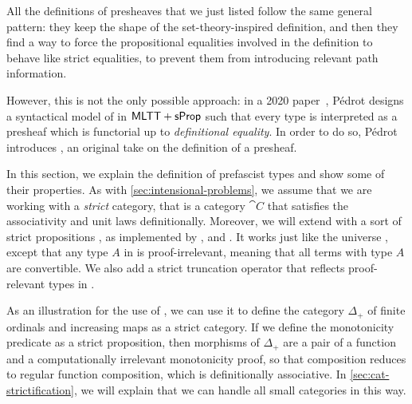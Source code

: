 All the definitions of presheaves that we just listed follow the same general
pattern: they keep the shape of the set-theory-inspired definition, and
then they find a way to force the propositional equalities involved in the
definition to behave like strict equalities, \ie to prevent them from 
introducing relevant path information. 

However, this is not the only possible approach: 
% 
in a 2020 paper~, Pédrot designs a syntactical model of \MLTT in
\( \mathsf{MLTT}+\mathsf{sProp} \) such that every type is interpreted as a presheaf which
is functorial up to \emph{definitional equality}. 
% 
In order to do so, Pédrot introduces , an original
take on the definition of a presheaf.

In this section, we explain the definition of prefascist types and show some of 
their properties.
% 
As with \cref{sec:intensional-problems}, we assume that we are working with a 
\emph{strict} category, that is a category \( \cat{C} \) that satisfies the 
associativity and unit laws definitionally. 
% 
% 
Moreover, we will extend \MLTT with a sort of strict propositions ,
as implemented by \Coq, \Agda and \Lean \cite{gilbert:hal-01859964}.
% 
It works just like the universe , except that any type \( A \) 
in  is proof-irrelevant, meaning that all terms with type 
\( A \) are convertible.
% 
We also add a strict truncation operator  that reflects 
proof-relevant types in .

As an illustration for the use of , we can use it to define the category
\( \Delta_+ \) of finite ordinals and increasing maps as a strict category.
If we define the monotonicity predicate as a strict proposition, then 
morphisms of \( \Delta_+ \) are a pair of a function and a computationally
irrelevant monotonicity proof, so that composition reduces to regular function 
composition, which is definitionally associative.
% 
In \cref{sec:cat-strictification}, we will explain that we can handle all small
categories in this way.

